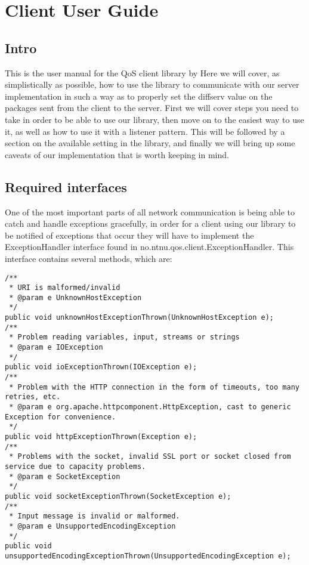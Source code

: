 \section{Client User Guide}\label{Client User Guide} 
\subsection{Intro}\label{userguideIntro}
This is the user manual for the QoS client library by %
Here we will cover, as simplistically as possible, how to use the library to communicate with our server implementation in such a way as to properly set the diffserv value on the packages sent from the client to the server.
First we will cover steps you need to take in order to be able to use our library, then move on to the easiest way to use it, as well as how to use it with a listener pattern. This will be followed by a section on the available setting in the library, and finally we will bring up some caveats of our implementation that is worth keeping in mind.

\subsection{Required interfaces}\label{userguideReqiredInterfaces}
One of the most important parts of all network communication is being able to catch and handle exceptions gracefully, in order for a client using our library to be notified of exceptions that occur they will have to implement the ExceptionHandler interface found in no.ntnu.qos.client.ExceptionHandler. This interface contains several methods, which are:

\lstset{language=java}
\lstset{frame=single}
\lstset{breaklines=true}
\begin{lstlisting}[caption={ExceptionHandler interface}, label=userguideExceptionHandler]
/**
 * URI is malformed/invalid
 * @param e UnknownHostException
 */
public void unknownHostExceptionThrown(UnknownHostException e);
/**
 * Problem reading variables, input, streams or strings
 * @param e IOException
 */
public void ioExceptionThrown(IOException e);
/**
 * Problem with the HTTP connection in the form of timeouts, too many retries, etc.
 * @param e org.apache.httpcomponent.HttpException, cast to generic Exception for convenience.
 */
public void httpExceptionThrown(Exception e);
/**
 * Problems with the socket, invalid SSL port or socket closed from service due to capacity problems.
 * @param e SocketException
 */
public void socketExceptionThrown(SocketException e);
/**
 * Input message is invalid or malformed.
 * @param e UnsupportedEncodingException
 */
public void unsupportedEncodingExceptionThrown(UnsupportedEncodingException e);
\end{lstlisting}

